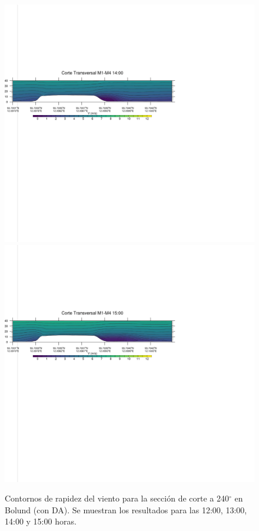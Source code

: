\begin{figure}[H]
	\includegraphics[width=0.90\linewidth,trim={0mm 202.0mm 111mm 106mm},clip]{Imagenes/06/bol_da/1400rot}\\%
	\includegraphics[width=0.90\linewidth,trim={0mm 180.0mm 111mm 106mm},clip]{Imagenes/06/bol_da/1500rot}%
	\caption{Contornos de rapidez del viento para la sección de corte a 240$^\circ$ en Bolund (con DA). Se muestran los resultados para las 12:00, 13:00, 14:00 y 15:00 horas.}
	\label{fig:06_bol_da_cross}
\end{figure}

